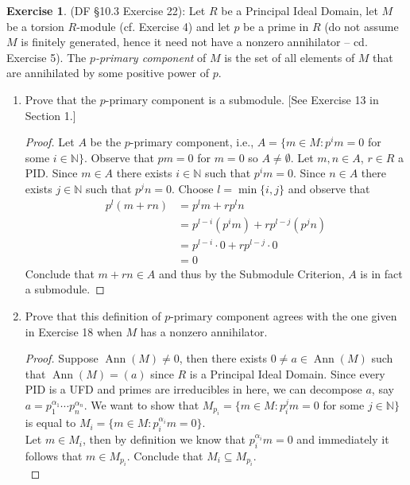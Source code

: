 \documentclass[8pt]{amsart}
\theoremstyle{plain}%
\theoremstyle{definition}
\newtheorem*{exercise}{Exercise}%
\theoremstyle{remark}
\numberwithin{equation}{section}
\newcommand{\N}{\mathbb{N}}
\begin{document}
\begin{exercise}
(DF \S 10.3 Exercise 22): Let $R$ be a Principal Ideal Domain, let $M$ be a torsion $R$-module (cf. Exercise 4) and let $p$ be a prime in $R$ (do not assume $M$ is finitely generated, hence it need not have a nonzero annihilator -- cd. Exercise 5). The \textit{$p$-primary component} of $M$ is the set of all elements of $M$ that are annihilated by some positive power of $p$.
	\begin{enumerate}
		\item Prove that the $p$-primary component is a submodule. [See Exercise 13 in Section 1.]
			\begin{proof}
				Let $A$ be the $p$-primary component, i.e.,  $A = \{m \in M : p^im = 0$ for some $i \in \N\}$. Observe that $pm = 0$ for $m = 0$ so $A \neq \emptyset$. Let $m, n \in A$, $r \in R$ a PID. Since $m \in A$ there exists $i \in \N$ such that $p^im = 0$. Since $n \in A$ there exists $j \in \N$ such that $p^jn = 0$. Choose $l = \min\{i, j\}$ and observe that
				\begin{align*}
					p^l(m + rn) &= p^lm + rp^ln\\
					&= p^{l - i}(p^im) + rp^{l - j}(p^jn)\\
					&= p^{l - i} \cdot 0 + rp^{l - j} \cdot 0\\
					&= 0
				\end{align*}
				Conclude that $m + rn \in A$ and thus by the Submodule Criterion, $A$ is in fact a submodule.
			\end{proof}
		\item Prove that this definition of $p$-primary component agrees with the one given in Exercise 18 when $M$ has a nonzero annihilator.
			\begin{proof}
				Suppose $\operatorname{Ann}(M) \neq 0$, then there exists $0 \neq a \in \operatorname{Ann}(M)$ such that $\operatorname{Ann}(M) = (a)$ since $R$ is a Principal Ideal Domain. Since every PID is a UFD and primes are irreducibles in here, we can decompose $a$, say $a = p_1^{\alpha_1}\cdots p_n^{\alpha_n}$. We want to show that $M_{p_i} = \{m \in M : p_i^jm = 0$ for some $j \in \N\}$ is equal to $M_i = \{m \in M : p_i^{\alpha_i}m = 0\}$.\\

				Let $m \in M_i$, then by definition we know that $p_i^{\alpha_i}m = 0$ and immediately it follows that $m \in M_{p_i}$. Conclude that $M_i \subseteq M_{p_i}$.\\


\end{proof}
\end{enumerate}
\end{exercise}
\end{document}
